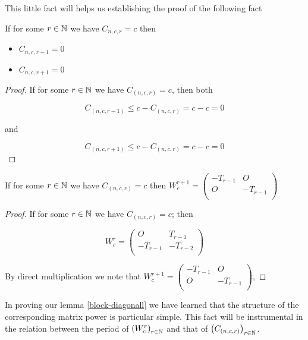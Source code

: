 This little fact will helps us establishing the proof of the following fact

\begin{corollary}
  If for some $r\in\mathbb{N}$ we have $C_{n,c,r} = c$ then
  \begin{itemize}
    \item $C_{n,c,r-1} = 0$
    \item $C_{n,c,r+1} = 0$
  \end{itemize}
\end{corollary}

\begin{proof}
  If for some $r\in\mathbb{N}$ we have $C_{(n,c,r)} = c$, then both

  \[
    C_{(n, c, r-1)} \leq c - C_{(n,c,r)} = c - c = 0
  \]

  and

  \[
    C_{(n, c, r+1)} \leq c - C_{(n,c,r)} = c - c = 0
  \]
\end{proof}

\begin{lemma}\label{block-diagonal}
  If for some $r\in\mathbb{N}$ we have $C_{(n,c,r)} = c$ then
  $W_{c}^{r+1} = \left(\begin{smallmatrix} -T_{r-1} & O \\ O & -T_{r-1} \\\end{smallmatrix}\right)$
\end{lemma}

\begin{proof}
  If for some $r\in\mathbb{N}$ we have $C_{(n,c,r)} = c$; then

  \[
  W_{c}^{r}
  =
  \left(
  \begin{array}{cc}
     O    &  T_{r-1}  \\
    -T_{r-1} & -T_{r-2} \\
  \end{array}
  \right)
  \]

  By direct multiplication we note that
  $W_{c}^{r+1} = \left(\begin{smallmatrix} -T_{r-1} & O \\ O & -T_{r-1} \\\end{smallmatrix}\right)$,
\end{proof}

In proving our lemma \ref{block-diagonall} we have learned that the
structure of the corresponding matrix power is particular simple. This fact will
be instrumental in the relation between the period of
$\left(W_{c}^{r}\right)_{r\in\mathbb{N}}$ and that of
$\left(C_{(n,c,r)}\right)_{r\in\mathbb{N}}$.

